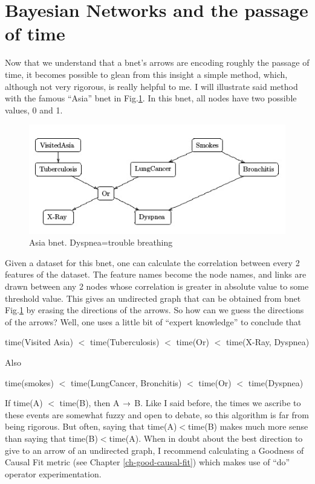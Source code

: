 \section{Bayesian Networks and the passage of time}

Now that we understand that a bnet’s arrows are encoding roughly the passage
of time, it becomes possible to glean from this insight a simple method,
which, although not very rigorous, is really helpful to me. I will illustrate
said method with the famous ``Asia” bnet in Fig.\ref{fig-asia}.
 In this bnet, all nodes
have two  possible values, 0 and 1.

\begin{figure}[h!]
\centering
\includegraphics[width=5in]
{bnets-time/asia.jpg}
\caption{Asia bnet. Dyspnea=trouble breathing}
\label{fig-asia}
\end{figure}


Given a dataset for this bnet, one can calculate the correlation between
every 2 features of the dataset. The feature names become the node names, and
links are drawn between any 2 nodes whose correlation is greater in absolute
value to some threshold value. This gives an undirected graph that can be
obtained from bnet Fig.\ref{fig-asia}
 by erasing the directions of the arrows. So how
can we guess the directions of the arrows? Well, one uses a little bit of
``expert knowledge” to conclude that

time(Visited Asia) $<$ time(Tuberculosis) $<$ time(Or) $<$ time(X-Ray,
Dyspnea)

Also

time(smokes) $<$ time(LungCancer, Bronchitis) $<$ time(Or) $<$ time(Dyspnea)

If time(A) $<$ time(B), then A $\rightarrow$ B. Like I
said before, the times we ascribe to
these events are somewhat fuzzy and open to debate, so this algorithm is far
from being rigorous. But often, saying that  time(A)$<$time(B) makes much more
sense than saying that time(B)$<$time(A). When in doubt about the best
direction to give to an arrow of an undirected graph, I recommend calculating
a Goodness of Causal Fit metric (see Chapter
\ref{ch-good-causal-fit}) which makes use of ``do” operator
experimentation.


